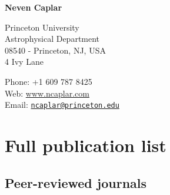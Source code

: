 \documentclass[11pt,letterpaper]{article}
\def\name{\textbf{Neven Caplar}}
\begin{document}
{\huge \name}


\bigskip

\begin{minipage}[t]{0.645\textwidth}
  Princeton University\\
  Astrophysical Department \\
  08540 - Princeton, NJ, USA	 \\
	4 Ivy Lane
\end{minipage}
\begin{minipage}[t]{0.345\textwidth}
  Phone: +1 609 787 8425 \\
  Web: \href{ www.ncaplar.com}{www.ncaplar.com} \\
  Email: \href{ncaplar@princeton.edu}{\nolinkurl{ncaplar@princeton.edu}} \\

\end{minipage}




\section*{Full publication list}


\subsection*{Peer-reviewed journals}
\end{document}
